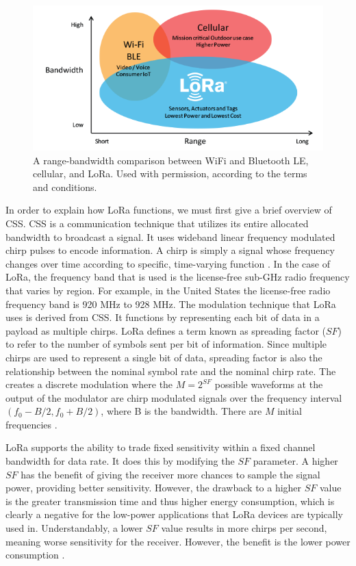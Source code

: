 \begin{figure}
    \centering
    \includegraphics[width=6in]{figures/lora-range-bandwidth.png}
    \caption{A range-bandwidth comparison between WiFi and Bluetooth LE, cellular, and LoRa. Used with permission, according to the terms and conditions.}
    \label{fig:lora-range-bandwidth}
\end{figure}


In order to explain how LoRa functions, we must first give a brief overview of CSS. CSS is a communication technique that utilizes its entire allocated bandwidth to broadcast a signal. It uses wideband linear frequency modulated chirp pulses to encode information. A chirp is simply a signal whose frequency changes over time according to specific, time-varying function \cite{ieee-std-chirp}. In the case of LoRa, the frequency band that is used is the license-free sub-GHz radio frequency that varies by region. For example, in the United States the license-free radio frequency band is 920 MHz to 928 MHz. The modulation technique that LoRa uses is derived from CSS. It functions by representing each bit of data in a payload as multiple chirps. LoRa defines a term known as spreading factor ($SF$) to refer to the number of symbols sent per bit of information. Since multiple chirps are used to represent a single bit of data, spreading factor is also the relationship between the nominal symbol rate and the nominal chirp rate. The creates a discrete modulation where the $M=2^{SF}$ possible waveforms at the output of the modulator are chirp modulated signals over the frequency interval $(f_0 - B/2, f_0 + B/2)$, where B is the bandwidth. There are $M$ initial frequencies \cite{ieee-lora-modulation}.

LoRa supports the ability to trade fixed sensitivity within a fixed channel bandwidth for data rate. It does this by modifying the $SF$ parameter. A higher $SF$ has the benefit of giving the receiver more chances to sample the signal power, providing better sensitivity. However, the drawback to a higher $SF$ value is the greater transmission time and thus higher energy consumption, which is clearly a negative for the low-power applications that LoRa devices are typically used in. Understandably, a lower $SF$ value results in more chirps per second, meaning worse sensitivity for the receiver. However, the benefit is the lower power consumption \cite{ttn-spreading-factor}.

